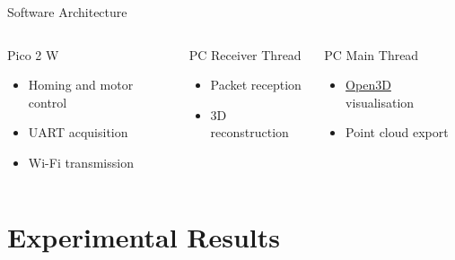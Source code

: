 \documentclass[169]{beamer}
\begin{document}
\begin{frame}{Software Architecture}
\begin{center}
\end{center}

\begin{columns}[c]
{
    \begin{block}{Pico 2 W}
        \begin{itemize}
            \item Homing and motor control
            \item UART acquisition
            \item Wi-Fi transmission
        \end{itemize}
    \end{block}
}
{
    \begin{block}{PC Receiver Thread}
    \begin{itemize}
        \item Packet reception
        \item 3D reconstruction
    \end{itemize}
    \end{block}
    
    \begin{block}{PC Main Thread}
    \begin{itemize}
        \item \href{https://arxiv.org/abs/1801.09847}{Open3D} visualisation
        \item Point cloud export
    \end{itemize}
    \end{block}
}

\end{columns}
\end{frame}

\section{Experimental Results}
\end{document}
